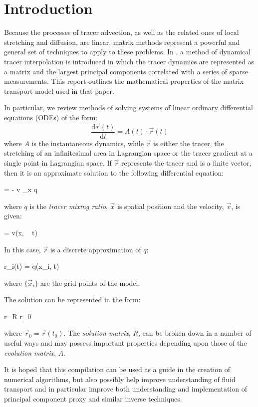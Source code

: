 
\section{Introduction}

Because the processes of tracer advection, as well as the related ones
of local stretching and diffusion, are linear, 
matrix methods represent a powerful and
general set of techniques to apply to these problems.
In \citet{Mills2018}, a method of dynamical tracer interpolation
is introduced
in which the tracer dynamics are represented as a matrix and the largest
principal components correlated with a series of sparse measurements.
This report outlines the mathematical properties of
the matrix transport model used in that paper.

In particular, 
we review methods of solving systems of linear ordinary differential
equations (ODEs) of the form:
\begin{equation}
\frac{\mathrm d \vec r(t)}{\mathrm d t} = A(t) \cdot \vec r(t)
\end{equation}
where $A$ is the instantaneous dynamics, while $\vec r$ is either the tracer,
the stretching of an infinitesimal area in Lagrangian space or the tracer gradient at a single point
in Lagrangian space. 
If $\vec r$ represents the tracer and is a finite vector,
then it is an approximate solution to the following differential equation:
\begin{eqnl}
	 = - \vec v \cdot \nabla_{\vec x} q
\end{eqnl}
where $q$ is the {\it tracer mixing ratio}, $\vec x$ is spatial position and the velocity, $\vec v$, is given:
\begin{eqnl}
	 = \vec v(\vec x, ~ t)
\end{eqnl}
In this case, $\vec r$ is a discrete approximation of $q$:
\begin{eqnl}
	r_i(t) = q(\vec x_i, t)
\end{eqnl}
where $\lbrace \vec x_i \rbrace$ are the grid points of the model.

The solution can be represented in the form:
\begin{eqnl}
	\vec r=R \cdot \vec r_0
\end{eqnl}
where $\vec r_0=\vec r(t_0)$.
The {\it solution matrix}, $R$, can be broken down in a number of useful ways
and may possess important properties depending upon those of
the {\it evolution matrix}, $A$.

It is hoped that this compilation can be used as a guide in the creation
of numerical algorithms, but also possibly
help improve understanding of fluid transport and in particular 
improve both understanding and implementation of principal component
proxy and similar inverse techniques.


